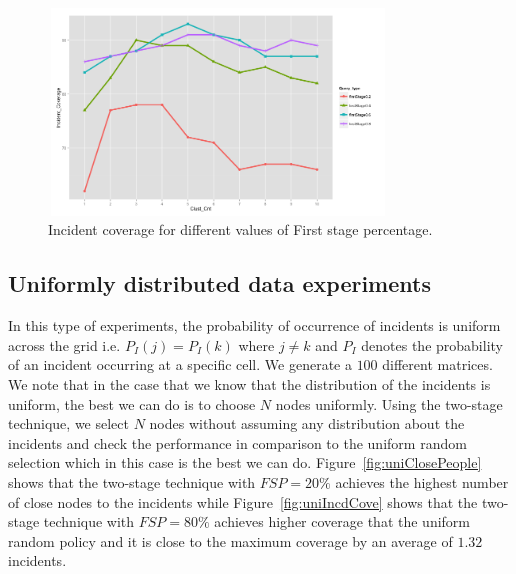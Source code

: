 \documentclass{acm_proc_article-sp}
\begin{document}
\begin{figure}[!h]
\centering
 \includegraphics[width=9cm ,height=5.5cm]{figuresPng/Coverage_Result.png}
 \caption{Incident coverage for different values of First stage percentage. }
 \label{fig: clustCoverage}
\end{figure}



\subsection{Uniformly distributed data experiments}
In this type of experiments, the probability of occurrence of incidents is uniform across the grid i.e. $P_I (j) = P_I (k)$ where $j \neq k$ and $P_I$ denotes the probability of an incident occurring at a specific cell. We generate a $100$ different matrices. We note that in the case that we know that the distribution of the incidents is uniform, the best we can do is to choose $N$ nodes uniformly. Using the two-stage technique, we select $N$ nodes without assuming any distribution about the incidents and check the performance in comparison to the uniform random selection which in this case is the best we can do. Figure~\ref{fig:uniClosePeople} shows that the two-stage technique with $FSP = 20\%$ achieves the highest number of close nodes to the incidents while Figure~\ref{fig:uniIncdCove} shows that the two-stage technique with $FSP = 80\%$ achieves higher coverage that the uniform random policy and it is close to the maximum coverage by an average of $1.32$ incidents.
\end{document}
